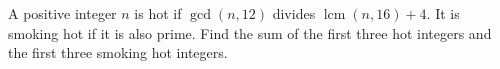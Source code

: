 A positive integer $n$ is hot if $\gcd(n,12)$ divides $\operatorname{lcm}(n,16)+4$. It is smoking hot if it is also prime. Find the sum of the first three hot integers and the first three smoking hot integers.
